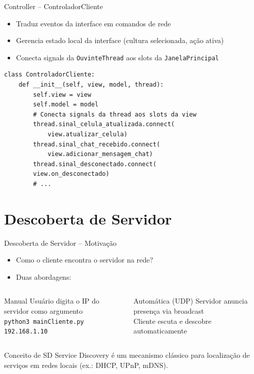 \documentclass[aspectratio=169]{beamer}
\begin{document}
\begin{frame}[fragile]{Controller -- ControladorCliente}
  \begin{itemize}
    \item Traduz eventos da interface em comandos de rede
    \item Gerencia estado local da interface (cultura selecionada, a\c{c}\~ao ativa)
    \item Conecta signals da \texttt{OuvinteThread} aos slots da \texttt{JanelaPrincipal}
  \end{itemize}
  \vfill
\begin{lstlisting}[style=pycode, basicstyle=\ttfamily\footnotesize]
class ControladorCliente:
    def __init__(self, view, model, thread):
        self.view = view
        self.model = model
        # Conecta signals da thread aos slots da view
        thread.sinal_celula_atualizada.connect(
            view.atualizar_celula)
        thread.sinal_chat_recebido.connect(
            view.adicionar_mensagem_chat)
        thread.sinal_desconectado.connect(
        view.on_desconectado)
        # ...
\end{lstlisting}
\end{frame}

\section{Descoberta de Servidor}

\begin{frame}{Descoberta de Servidor -- Motiva\c{c}\~ao}
  \begin{itemize}
    \item Como o cliente encontra o servidor na rede?
    \item Duas abordagens:
  \end{itemize}
  \vfill
  \begin{columns}
    \begin{block}{Manual}
      Usu\'ario digita o IP do servidor como argumento \\
      \texttt{python3 mainCliente.py 192.168.1.10}
    \end{block}
    \begin{block}{Autom\'atica (UDP)}
      Servidor anuncia presen\c{c}a via broadcast \\
      Cliente escuta e descobre automaticamente
    \end{block}
  \end{columns}
  \vfill
  \begin{exampleblock}{Conceito de SD}
    Service Discovery \'e um mecanismo cl\'assico para localiza\c{c}\~ao de servi\c{c}os em redes locais (ex.: DHCP, UPnP, mDNS).
  \end{exampleblock}
\end{frame}
\end{document}
